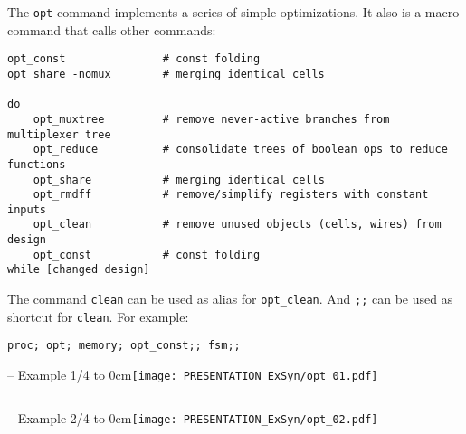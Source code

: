 \begin{frame}[fragile]{\subsecname}
The {\tt opt} command implements a series of simple optimizations. It also
is a macro command that calls other commands:

\begin{lstlisting}[xleftmargin=0.5cm, basicstyle=\ttfamily\fontsize{8pt}{10pt}\selectfont]
opt_const               # const folding
opt_share -nomux        # merging identical cells

do
    opt_muxtree         # remove never-active branches from multiplexer tree
    opt_reduce          # consolidate trees of boolean ops to reduce functions
    opt_share           # merging identical cells
    opt_rmdff           # remove/simplify registers with constant inputs
    opt_clean           # remove unused objects (cells, wires) from design
    opt_const           # const folding
while [changed design]
\end{lstlisting}

The command {\tt clean} can be used as alias for {\tt opt\_clean}. And {\tt ;;}
can be used as shortcut for {\tt clean}. For example:

\begin{lstlisting}[xleftmargin=0.5cm, basicstyle=\ttfamily\fontsize{8pt}{10pt}\selectfont]
proc; opt; memory; opt_const;; fsm;;
\end{lstlisting}
\end{frame}

\begin{frame}[t, fragile]{\subsecname{} -- Example 1/4}
\vbox to 0cm{\texttt{[image: PRESENTATION\_ExSyn/opt\_01.pdf]}\vss}
\vskip-1cm
\begin{columns}
\column[t]{5cm}

\column[t]{5cm}

\end{columns}
\end{frame}

\begin{frame}[t, fragile]{\subsecname{} -- Example 2/4}
\vbox to 0cm{\texttt{[image: PRESENTATION\_ExSyn/opt\_02.pdf]}\vss}
\vskip-1cm
\begin{columns}
\column[t]{5cm}

\column[t]{5cm}

\end{columns}
\end{frame}


